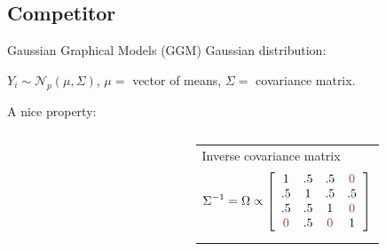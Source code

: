 \documentclass[aspectratio=169]{beamer}
\newcommand{\edgeunit}{1.5}
\newcommand{\emphase}[1]{\textcolor{Complement}{#1}}
\newcommand{\Ncal}{\mathcal{N}}
\begin{document}
\subsection{Competitor}

\begin{frame}{Gaussian Graphical Models (GGM) }
   \emphase{Gaussian distribution:}\\
 \begin{center}
	$  Y_i \sim \Ncal_p(\mu, \Sigma) $, $\mu =$ vector of means, $\Sigma =$ covariance matrix.
\end{center}
  
 
  
   \bigskip %
  \emphase{A nice property:} ~ \\

  \begin{columns}
  \begin{column}{0.15\textwidth}
	
\end{column}
  \begin{column}{0.4\textwidth}
    \end{column}
    \begin{column}{8cm}
 
    \begin{tabular}{p{}}
	 Inverse covariance matrix
	 $$
	 \Sigma^{-1} = \Omega \propto \left[ \begin{array}{cccc}
	   1 & .5 & .5 & \emphase{0} \\
	   .5 & 1 & .5 & .5 \\
	   .5 & .5 & 1 & \emphase{0} \\
	   \emphase{0} & .5& \emphase{0}  & 1
	   \end{array} \right] 
	 $$
    \end{tabular} 
   

\end{column}
\end{columns}
\end{frame}
\end{document}
